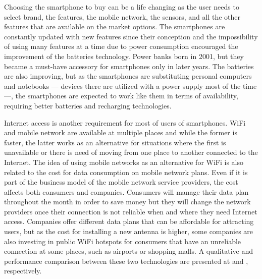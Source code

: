 Choosing the smartphone to buy can be a life changing
as the user needs to select brand, the features, the mobile network, the sensors, and all the other features that are available on the market options.
The smartphones are constantly updated with new features since their conception and the impossibility of using many features at a time due to power consumption encouraged the improvement of the batteries technology.
Power banks born in 2001, but they became a must-have accessory for smartphones only in later years.
The batteries are also improving, but as the smartphones are substituting personal
computers and notebooks --- devices there are utilized with a power supply most of the time ---, the smartphones are expected to work like them in terms of availability, requiring better batteries and recharging technologies.

Internet access is another requirement for most of users of smartphones.
WiFi and mobile network
are available at multiple places and while the former is faster, the latter works as an alternative for situations where the first is unavailable or there is need of moving from one place to another connected to the Internet.
The idea of using mobile networks as an alternative for WiFi is also related to the cost for data consumption on mobile network plans.
Even if it is part of the business model of the mobile network service providers, the cost affects both consumers and companies.
Consumers will manage their data plan throughout the month in order to save money but they will change the network providers once their connection is not reliable when and where they need Internet access.
Companies offer different data plans that can be affordable for attracting users, but as the cost for installing a new antenna is higher, some companies are also investing in public WiFi hotspots for consumers that have an unreliable connection at some places, such as airports or shopping malls.
A qualitative and performance comparison between these two technologies are presented at \cite{Lehr2003wireless} and \cite{Gass20103gwificomparison}, respectively.

